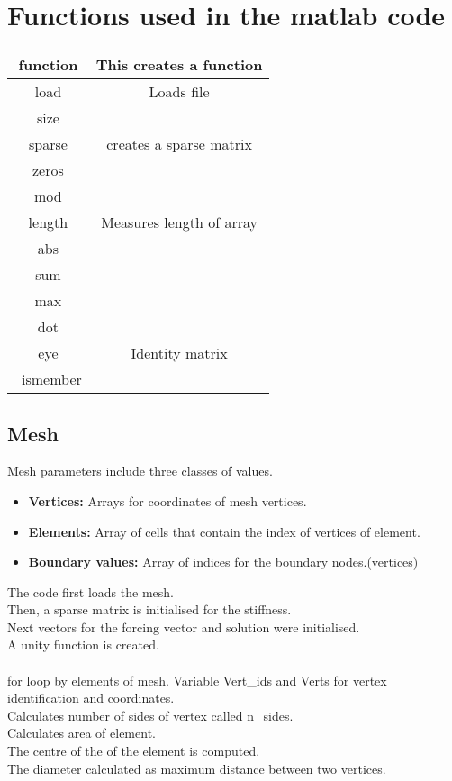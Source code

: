 \documentclass[../main.tex]{subfiles}
\begin{document}
\section{Functions used in the matlab code}
\begin{tabular}{|c|c|}
    \hline
    function & This creates a function\\
    \hline
    load & Loads file\\
    \hline
    size & \\
    \hline
    sparse & creates a sparse matrix\\
    \hline
    zeros & \\
    \hline
    mod & \\
    \hline
    length & Measures length of array\\
    \hline
    abs & \\
    \hline
    sum & \\
    \hline
    max & \\
    \hline
    dot & \\
    \hline
    eye & Identity matrix\\ 
    \hline
    ~ismember & \\
    \hline
\end{tabular}

\subsection{Mesh}
Mesh parameters include three classes of values.
\begin{itemize}
    \item \textbf{Vertices:} Arrays for coordinates of mesh vertices.
    \item \textbf{Elements:} Array of cells that contain the index of vertices of element.
    \item \textbf{Boundary values:} Array of indices for the boundary nodes.(vertices)
\end{itemize}

The code first loads the mesh. \\
Then, a sparse matrix is initialised for the stiffness.\\
Next vectors for the forcing vector and solution were initialised.\\
A unity function is created.\\
\\
for loop by elements of mesh.
Variable Vert_ids and Verts for vertex identification and coordinates.\\
Calculates number of sides of vertex called n_sides.\\
Calculates area of element.\\
The centre of the of the element is computed.\\
The diameter calculated as maximum distance between two vertices.\\
\end{document}
